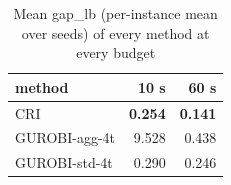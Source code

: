 \begin{table}[htbp]
\centering
\small
\caption{Mean gap\_lb (per-instance mean over seeds) of every method at every budget}
\label{tab:E7_gurobi_threads_gap_by_budget}
\begin{tabular}{lrr}
\toprule
method & 10 s & 60 s \\
\midrule
CRI & \textbf{0.254} & \textbf{0.141} \\
GUROBI-agg-4t & 9.528 & 0.438 \\
GUROBI-std-4t & 0.290 & 0.246 \\
\bottomrule
\end{tabular}
\end{table}
